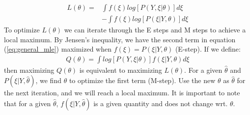 \documentclass[12pt]{article}
\numberwithin{equation}{section}
\begin{document}
\begin{align}
    L(\theta) = & \int f(\xi)log[P(Y,\xi|\theta)]d\xi \nonumber \\
    & - \int f(\xi)log[P(\xi|Y,\theta)]d\xi \nonumber
\end{align}
To optimize $L(\theta)$ we can iterate through the E steps and M steps to achieve a local maximum. By Jensen's inequality, we have the second term in equation (\ref{eq:general_mle}) maximized when $f(\xi)=P(\xi|Y,\theta)$ (E-step). If we define:
\begin{align}
    Q(\theta) = \int log[P(Y,\xi|\theta)]f(\xi|Y,\theta)d\xi \label{eq:Q}
\end{align}
then maximizing $Q(\theta)$ is equivalent to maximizing $ L(\theta)$. For a given $\hat{\theta}$ and $P(\xi|Y, \hat{\theta})$, we find $\theta$ to optimize the first term (M-step). Use the new $\theta$ as $\hat{\theta}$ for the next iteration, and we will reach a local maximum. It is important to note that for a given $\hat{\theta}$, $f(\xi|Y, \hat{\theta})$ is a given quantity and does not change wrt. $\theta$. 
\end{document}
